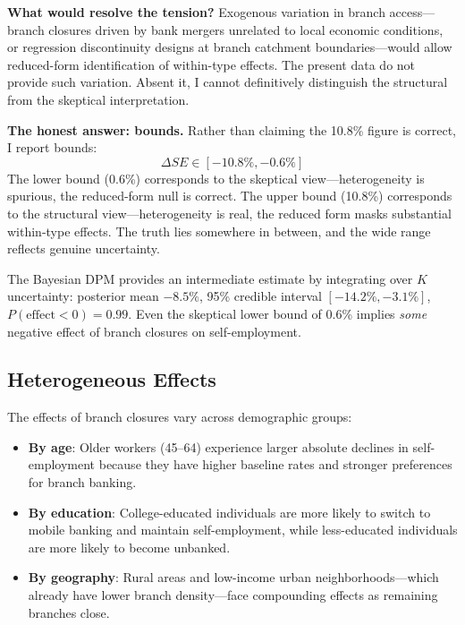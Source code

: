 \documentclass[12pt]{article}
\begin{document}
\textbf{What would resolve the tension?} Exogenous variation in branch access---branch closures driven by bank mergers unrelated to local economic conditions, or regression discontinuity designs at branch catchment boundaries---would allow reduced-form identification of within-type effects. The present data do not provide such variation. Absent it, I cannot definitively distinguish the structural from the skeptical interpretation.

\textbf{The honest answer: bounds.} Rather than claiming the 10.8\% figure is correct, I report bounds:
\begin{equation*}
\Delta SE \in [-10.8\%, -0.6\%]
\end{equation*}
The lower bound (0.6\%) corresponds to the skeptical view---heterogeneity is spurious, the reduced-form null is correct. The upper bound (10.8\%) corresponds to the structural view---heterogeneity is real, the reduced form masks substantial within-type effects. The truth lies somewhere in between, and the wide range reflects genuine uncertainty.

The Bayesian DPM provides an intermediate estimate by integrating over $K$ uncertainty: posterior mean $-8.5\%$, 95\% credible interval $[-14.2\%, -3.1\%]$, $P(\text{effect} < 0) = 0.99$. Even the skeptical lower bound of 0.6\% implies \textit{some} negative effect of branch closures on self-employment.

\subsection{Heterogeneous Effects}

The effects of branch closures vary across demographic groups:

\begin{itemize}
    \item \textbf{By age}: Older workers (45--64) experience larger absolute declines in self-employment because they have higher baseline rates and stronger preferences for branch banking.

    \item \textbf{By education}: College-educated individuals are more likely to switch to mobile banking and maintain self-employment, while less-educated individuals are more likely to become unbanked.

    \item \textbf{By geography}: Rural areas and low-income urban neighborhoods---which already have lower branch density---face compounding effects as remaining branches close.
\end{itemize}
\end{document}
